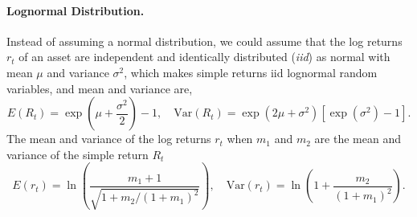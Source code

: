 \paragraph{Lognormal Distribution.} Instead of assuming a normal distribution, we could assume that the log returns $r_t$ of an asset are independent and identically distributed (\emph{iid}) as normal with mean $\mu$ and variance $\sigma^2$, which makes simple returns iid lognormal random variables, and mean and variance are,
\[
E(R_t)=\exp \left( \mu + \frac{\sigma^2}{2} \right) -1, \quad
\text{Var}(R_t) = \exp(2\mu+\sigma^2)[\exp(\sigma^2)-1].
\]
The mean and variance of the log returns $r_t$ when $m_1$ and $m_2$ are the mean and variance of the simple return $R_t$
\[
E(r_t) = \ln \left( \frac{m_1+1}{\sqrt{1+m_2 / (1+m_1)^2}} \right), \quad
\text{Var}(r_t)=\ln \left( 1+\frac{m_2}{(1+m_1)^2} \right).
\]

